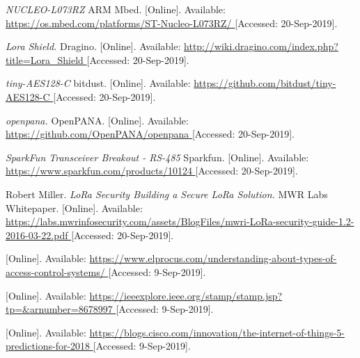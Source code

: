 \begin{thebibliography}{9}

\textit{
NUCLEO-L073RZ
}
ARM Mbed.
[Online]. Available:
\url{
https://os.mbed.com/platforms/ST-Nucleo-L073RZ/
}
[Accessed: 20-Sep-2019].



\textit{
Lora Shield.
}
Dragino.
[Online]. Available:
\url{
http://wiki.dragino.com/index.php?title=Lora_Shield
}
[Accessed: 20-Sep-2019].



\textit{
tiny-AES128-C
}
bitdust.
[Online]. Available:
\url{
https://github.com/bitdust/tiny-AES128-C
}
[Accessed: 20-Sep-2019].



\textit{
openpana.
}
OpenPANA.
[Online]. Available:
\url{
https://github.com/OpenPANA/openpana
}
[Accessed: 20-Sep-2019].



\textit{
SparkFun Transceiver Breakout - RS-485
}
Sparkfun.
[Online]. Available:
\url{
https://www.sparkfun.com/products/10124
}
[Accessed: 20-Sep-2019].



Robert Miller.
\textit{
LoRa Security
Building a Secure LoRa Solution.
}
MWR Labs Whitepaper.
[Online]. Available:
\url{
https://labs.mwrinfosecurity.com/assets/BlogFiles/mwri-LoRa-security-guide-1.2-2016-03-22.pdf
}
[Accessed: 20-Sep-2019].






[Online]. Available:
\url{
https://www.elprocus.com/understanding-about-types-of-access-control-systems/
}
[Accessed: 9-Sep-2019].




[Online]. Available:
\url{
https://ieeexplore.ieee.org/stamp/stamp.jsp?tp=&arnumber=8678997
}
[Accessed: 9-Sep-2019].



[Online]. Available:
\url{
https://blogs.cisco.com/innovation/the-internet-of-things-5-predictions-for-2018
}
[Accessed: 9-Sep-2019].


\end{thebibliography}
